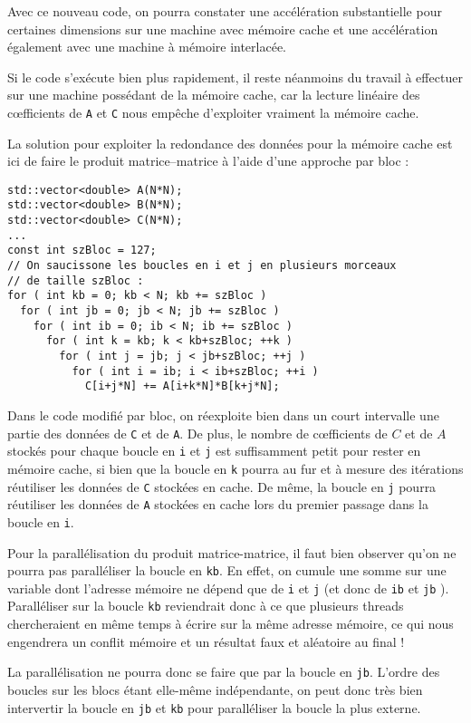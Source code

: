 \documentclass[fleqn,11pt]{article}
\begin{document}
Avec ce nouveau code, on pourra constater une accélération substantielle pour certaines dimensions sur une machine avec mémoire cache et une accélération également avec une machine à mémoire interlacée.

Si le code s'exécute bien plus rapidement, il reste néanmoins du travail à effectuer sur une machine possédant de la mémoire cache, car la lecture linéaire des c{\oe}fficients de \texttt{A} et \texttt{C} nous empêche d'exploiter vraiment la mémoire cache.

La solution pour exploiter la redondance des données pour la mémoire cache est ici de faire le produit matrice--matrice à l'aide d'une approche par bloc :

\begin{lstlisting}
std::vector<double> A(N*N);
std::vector<double> B(N*N);
std::vector<double> C(N*N);
...
const int szBloc = 127;
// On saucissone les boucles en i et j en plusieurs morceaux 
// de taille szBloc :
for ( int kb = 0; kb < N; kb += szBloc )
  for ( int jb = 0; jb < N; jb += szBloc )
    for ( int ib = 0; ib < N; ib += szBloc )
      for ( int k = kb; k < kb+szBloc; ++k )
        for ( int j = jb; j < jb+szBloc; ++j )
          for ( int i = ib; i < ib+szBloc; ++i )
            C[i+j*N] += A[i+k*N]*B[k+j*N];
\end{lstlisting}

Dans le code modifié par bloc, on réexploite bien dans un court intervalle une partie des données
de \texttt{C} et de \texttt{A}. De plus, le nombre de c{\oe}fficients de $C$ et de $A$ stockés pour chaque
boucle en \texttt{i} et \texttt{j} est suffisamment petit pour rester en mémoire cache, si bien que la boucle
en \texttt{k} pourra au fur et à mesure des itérations réutiliser les données de \texttt{C} stockées en cache.
De même, la boucle en \texttt{j} pourra réutiliser les données de \texttt{A} stockées en cache lors du premier passage dans la boucle en \texttt{i}.

Pour la parallélisation du produit matrice-matrice, il faut bien observer qu'on ne pourra pas paralléliser
la boucle en \texttt{kb}. En effet, on cumule une somme sur une variable dont l'adresse mémoire ne dépend
que de \texttt{i} et \texttt{j} (et donc de \texttt{ib} et \texttt{jb} ). Paralléliser sur la boucle 
\texttt{kb} reviendrait donc à ce que plusieurs threads chercheraient en même temps à écrire sur la
même adresse mémoire, ce qui nous engendrera un conflit mémoire et un résultat faux et aléatoire au final !

La parallélisation ne pourra donc se faire que par la boucle en \texttt{jb}. L'ordre des boucles sur les blocs étant elle-même indépendante, on peut donc très bien intervertir la boucle en \texttt{jb} et \texttt{kb} pour paralléliser la boucle la plus externe.
\end{document}
